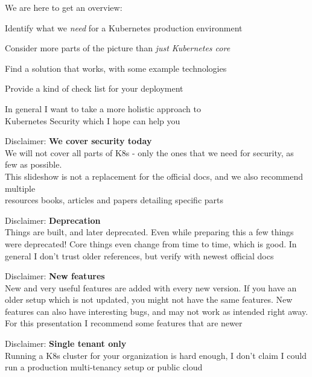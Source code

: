 \documentclass[Screen16to9,17pt]{foils}
\begin{document}
We are here to get an overview:
\begin{list2}
\item Identify what we \emph{need} for a Kubernetes production environment
\item Consider more parts of the picture than \emph{just Kubernetes core}
\item Find a solution that works, with some example technologies
\item Provide a kind of check list for your deployment
\end{list2}

\vskip 5mm
\begin{center}
In general I want to take a more holistic approach to\\
Kubernetes Security which I hope can help you
\end{center}



\begin{list2}
\item Disclaimer: {\bf We cover security today}\\
We will not cover all parts of K8s  - only the ones that we need for security, as few as possible.\\
This slideshow is not a replacement for the official docs, and we also recommend multiple\\ resources books, articles and papers detailing specific parts

\item Disclaimer: {\bf Deprecation}\\
Things are built, and later deprecated. Even while preparing this a few things were deprecated! Core things even change from time to time, which is good. In general I don't trust older references, but verify with newest official docs

\item Disclaimer: {\bf New features}\\
New and very useful features are added with every new version. If you have an older setup which is not updated, you might not have the same features. New features can also have interesting bugs, and may not work as intended right away. For this presentation I recommend some features that are newer

\item Disclaimer: {\bf Single tenant only}\\
Running a K8s cluster for your organization is hard enough, I don't claim I could run a production multi-tenancy setup or public cloud
\end{list2}
\end{document}
